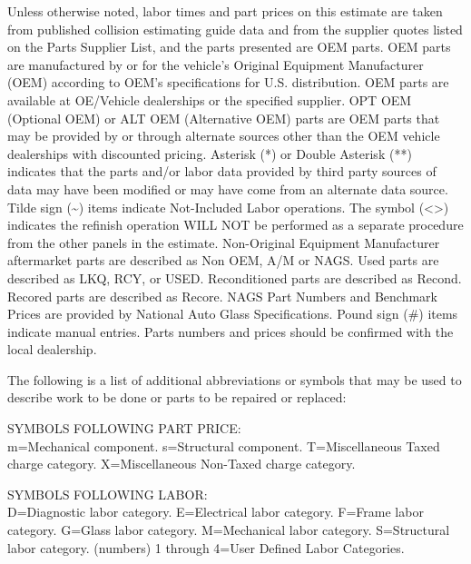\documentclass[letterpaper,10pt]{article}
\newcommand{\legal}{\fontsize{10}{13.3}\selectfont}      %
\begin{document}
\newpage
\legal\raggedright{}
\vspace*{-23pt}
Unless otherwise noted, labor times and part prices on this estimate are taken from published collision estimating guide data and from the supplier quotes listed on the Parts Supplier List, and the parts presented are OEM parts. OEM parts are manufactured by or for the vehicle's Original Equipment Manufacturer (OEM) according to OEM's specifications for U.S. distribution. OEM parts are available at OE/Vehicle dealerships or the specified supplier. OPT OEM (Optional OEM) or ALT OEM (Alternative OEM) parts are OEM parts that may be provided by or through alternate sources other than the OEM vehicle dealerships with discounted pricing. Asterisk (*) or Double Asterisk (**) indicates that the parts and/or labor data provided by third party sources of data may have been modified or may have come from an alternate data source. Tilde sign (\textasciitilde) items indicate Not-Included Labor operations. The symbol (<>) indicates the refinish operation WILL NOT be performed as a separate procedure from the other panels in the estimate. Non-Original Equipment Manufacturer aftermarket parts are described as Non OEM, A/M or NAGS. Used parts are described as LKQ, RCY, or USED. Reconditioned parts are described as Recond. Recored parts are described as Recore. NAGS Part Numbers and Benchmark Prices are provided by National Auto Glass Specifications. Pound sign (\#) items indicate manual entries. Parts numbers and prices should be confirmed with the local dealership.

\vspace{13.3pt}
The following is a list of additional abbreviations or symbols that may be used to describe work to be done or parts to be repaired or replaced:

\vspace{13.3pt}
SYMBOLS FOLLOWING PART PRICE:\\
m=Mechanical component. s=Structural component. T=Miscellaneous Taxed charge category. X=Miscellaneous Non-Taxed charge category.

\vspace{13.3pt}
SYMBOLS FOLLOWING LABOR:\\
D=Diagnostic labor category. E=Electrical labor category. F=Frame labor category. G=Glass labor category. M=Mechanical labor category. S=Structural labor category. (numbers) 1 through 4=User Defined Labor Categories.
\end{document}
